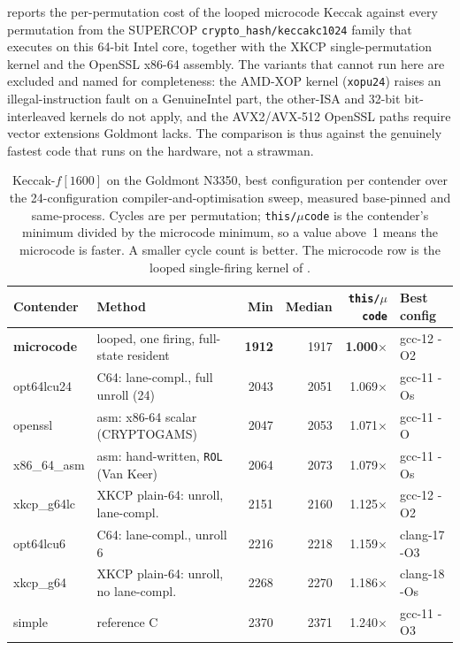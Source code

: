  reports the per-permutation cost of the looped
microcode Keccak against every permutation from the SUPERCOP
\texttt{crypto\_hash/keccakc1024} family that executes on this 64-bit Intel core,
together with the XKCP single-permutation kernel and the OpenSSL x86-64 assembly.
The variants that cannot run here are excluded and named for completeness: the
AMD-XOP kernel (\texttt{xopu24}) raises an illegal-instruction fault on a
GenuineIntel part, the other-ISA and 32-bit bit-interleaved kernels do not apply,
and the AVX2/AVX-512 OpenSSL paths require vector extensions Goldmont lacks. The
comparison is thus against the genuinely fastest code that runs on the hardware,
not a strawman.

\begin{table}[t]
\centering
\caption{Keccak-$f[1600]$ on the Goldmont N3350, best configuration per contender
over the 24-configuration compiler-and-optimisation sweep, measured base-pinned
and same-process. Cycles are per permutation; \texttt{this/$\mu$code} is the
contender's minimum divided by the microcode minimum, so a value above~1 means
the microcode is faster. A smaller cycle count is better. The microcode row is
the looped single-firing kernel of .}
\label{tab:results-keccak}
\small
\begin{tabular}{@{}llrrrl@{}}
\toprule
Contender & Method & Min & Median & \texttt{this/$\mu$code} & Best config \\
\midrule
\textbf{microcode} & looped, one firing, full-state resident & \textbf{1912} & 1917 & \textbf{1.000$\times$} & gcc-12 -O2 \\
\midrule
opt64lcu24        & C64: lane-compl., full unroll (24)       & 2043 & 2051 & 1.069$\times$ & gcc-11 -Os \\
openssl           & asm: x86-64 scalar (CRYPTOGAMS)          & 2047 & 2053 & 1.071$\times$ & gcc-11 -O  \\
x86\_64\_asm      & asm: hand-written, \texttt{ROL} (Van Keer) & 2064 & 2073 & 1.079$\times$ & gcc-11 -Os \\
xkcp\_g64lc       & XKCP plain-64: unroll, lane-compl.       & 2151 & 2160 & 1.125$\times$ & gcc-12 -O2 \\
opt64lcu6         & C64: lane-compl., unroll 6               & 2216 & 2218 & 1.159$\times$ & clang-17 -O3 \\
xkcp\_g64         & XKCP plain-64: unroll, no lane-compl.    & 2268 & 2270 & 1.186$\times$ & clang-18 -Os \\
simple            & reference C                              & 2370 & 2371 & 1.240$\times$ & gcc-11 -O3 \\

\end{tabular}
\end{table}
